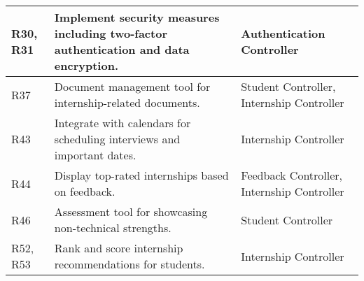 \begin{longtable}{|p{3cm}|p{5cm}|p{4cm}|}
\hline
R30, R31 & Implement security measures including two-factor authentication and data encryption. & Authentication Controller \\
\hline
R37 & Document management tool for internship-related documents. & Student Controller, Internship Controller \\
\hline
R43 & Integrate with calendars for scheduling interviews and important dates. & Internship Controller \\
\hline
R44 & Display top-rated internships based on feedback. & Feedback Controller, Internship Controller \\
\hline
R46 & Assessment tool for showcasing non-technical strengths. & Student Controller \\
\hline
R52, R53 & Rank and score internship recommendations for students. & Internship Controller \\
\hline
\end{longtable}